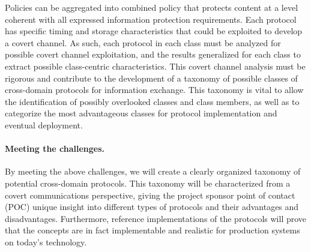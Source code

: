 \documentclass{sbir}
\begin{document}
Policies can be aggregated into combined policy that protects content at a level coherent with all expressed information protection requirements. Each protocol has specific timing and storage characteristics that could be exploited to develop a covert channel. As such, each protocol in each class must be analyzed for possible covert channel exploitation, and the results generalized for each class to extract possible class-centric characteristics. This covert channel analysis must be rigorous and contribute to the development of a taxonomy of possible classes of cross-domain protocols for information exchange. This taxonomy is vital to allow the identification of possibly overlooked classes and class members, as well as to categorize the most advantageous classes for protocol implementation and eventual deployment.

%

\paragraph{Meeting the challenges.} By meeting the above challenges, we will create a clearly organized taxonomy of potential cross-domain protocols. This taxonomy will be characterized from a covert communications perspective, giving the project sponsor point of contact (POC) unique insight into different types of protocols and their advantages and disadvantages. Furthermore, reference implementations of the protocols will prove that the concepts are in fact implementable and realistic for production systems on today's technology.
\end{document}
